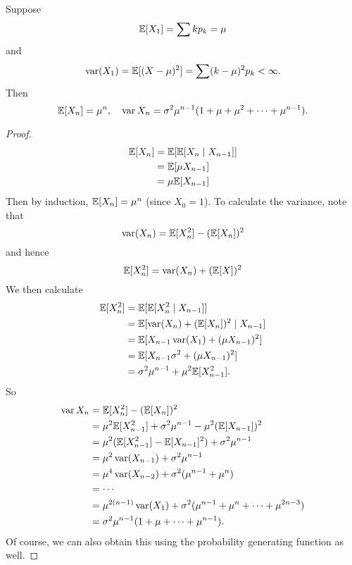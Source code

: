 %
\begin{note}
  \begin{field}
    \begin{thm}
      Suppose
      \[
        \mathbb{E}[X_1] = \sum k p_k = \mu
      \]
      and
      \[
        \operatorname{var} (X_1) = \mathbb{E}[(X - \mu)^2] = \sum (k - \mu)^2 p_k < \infty.
      \]
      Then
      \[
        \mathbb{E}[X_n] = \mu^n,\quad \operatorname{var} X_n = \sigma^2\mu^{n - 1}(1 + \mu + \mu^2 + \cdots + \mu^{n - 1}).
      \]
    \end{thm}
  \end{field}
  \begin{field}
    \begin{proof}
    \begin{align*}
      \mathbb{E}[X_n] &= \mathbb{E}[\mathbb{E}[X_n\mid X_{n - 1}]]\\
      &= \mathbb{E}[\mu X_{n - 1}]\\
      &= \mu \mathbb{E}[X_{n - 1}]
    \end{align*}
    Then by induction, $\mathbb{E}[X_n] = \mu^n$ (since $X_0 = 1$).
    To calculate the variance, note that
    \[
      \operatorname{var} (X_n) = \mathbb{E}[X_n^2] - (\mathbb{E}[X_n])^2
    \]
    and hence
    \[
      \mathbb{E}[X_n^2] = \operatorname{var}(X_n) + (\mathbb{E}[X])^2
    \]
    We then calculate
    \begin{align*}
      \mathbb{E}[X_n^2] &= \mathbb{E}[\mathbb{E}[X_n^2\mid X_{n - 1}]]\\
      &= \mathbb{E}[\operatorname{var}(X_n) + (\mathbb{E}[X_n])^2 \mid X_{n - 1}]\\
      &= \mathbb{E}[X_{n - 1}\operatorname{var} (X_1) + (\mu X_{n - 1})^2]\\
      &= \mathbb{E}[X_{n - 1}\sigma^2 + (\mu X_{n - 1})^2]\\
      &= \sigma^2 \mu^{n - 1} + \mu^2 \mathbb{E}[X_{n - 1}^2].
    \end{align*}
    So
    \begin{align*}
      \operatorname{var} X_n &= \mathbb{E}[X_n^2] - (\mathbb{E}[X_n])^2 \\
      &= \mu^2 \mathbb{E}[X_{n -1}^2] + \sigma^2 \mu^{n - 1} - \mu^2 (\mathbb{E}[X_{n - 1}])^2\\
      &= \mu^2(\mathbb{E}[X_{n - 1}^2] - \mathbb{E}[X_{n - 1}]^2) + \sigma^2\mu^{n - 1}\\
      &= \mu^2 \operatorname{var} (X_{n - 1}) + \sigma^2 \mu^{n -1 }\\
      &= \mu^4 \operatorname{var}(X_{n - 2}) + \sigma^2(\mu^{n - 1} + \mu^n)\\
      &= \cdots\\
      &= \mu^{2(n - 1)}\operatorname{var} (X_1) + \sigma^2 (\mu^{n - 1} + \mu^{n} + \cdots + \mu^{2n - 3})\\
      &= \sigma^2\mu^{n - 1}(1 + \mu + \cdots + \mu^{n - 1}).
    \end{align*}
    Of course, we can also obtain this using the probability generating function as well.
    \end{proof}
  \end{field}
  \xplain{}%
\end{note}

